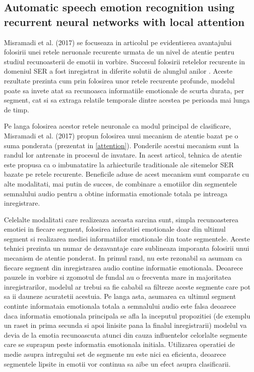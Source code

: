 \documentclass[a4paper,12pt]{book}
\begin{document}
					\subsection{Automatic speech emotion recognition using recurrent neural networks with local attention}
					 \label{prez_misramadi}
					 Misramadi et al. (2017) se focuseaza in articolul \cite{misramadi} pe evidentierea avantajului folosirii unei retele neruonale recurente urmata de un nivel de atentie pentru studiul recunoasterii de emotii in vorbire. Succesul folosirii retelelor recurente in domeniul SER a fost inregistrat in diferite solutii de alunglul anilor \cite{yuan,multi-domain,rnn1,rnn2}. Aceste rezultate prezinta cum prin folosirea unor retele recurente profunde, modelul poate sa invete atat sa recunoasca informatiile emotionale de scurta durata, per segment, cat si sa extraga relatile temporale dintre acestea pe perioada mai lunga de timp. \par
					 
					  \par 
					 Pe langa folosirea acestor retele neuronale ca modul principal de clasificare, Misramadi et al. (2017) propun folosirea unui mecanism de atentie bazat pe o suma ponderata (prezentat in \ref{attention}). Ponderile acestui mecanism sunt la randul lor antrenate in procesul de invatare. In acest articol, tehnica de atentie este propusa ca o imbunatatire la arhiecturile traditionale ale sitemelor SER bazate pe retele recurente. Beneficile aduse de acest mecanism sunt comparate cu alte modalitati, mai putin de succes, de combinare a emotiilor din segmentele semnalului audio pentru a obtine informatia emotionale totala pe intreaga inregistrare. \par
					 
					 Celelalte modalitati care realizeaza aceasta sarcina sunt, simpla recunoasterea emotiei in fiecare segment, folosirea inforatiei emotionale doar din ultimul segment si realizarea mediei informatiilor emotionale din toate segmentele. Aceste tehnici prezinta un numar de dezavantaje care sublineaza imporanta folosirii unui mecanism de atentie ponderat. In primul rand, nu este rezonabil sa asumam ca fiecare segment din inregistrarea audio contine informatie emotionala. Deoarece pauzele in vorbire si zgomotul de fundal au o frecventa mare in majoritatea inregistrarilor, modelul ar trebui sa fie cababil sa filtreze aceste segmente care pot sa ii dauneze acuratetii acestuia. Pe langa asta, asumarea ca ultimul segment continte informataia emotionala totala a semnalului audio este falsa deoarece daca informatia emotionala principala se afla la inceputul propozitiei (de exemplu un raset in prima secunda si apoi linisite pana la finalul inregistrarii) modelul va devia de la emotia recunoascuta atunci din cauza influentelor celorlalte segmente care se suprapun peste informatia emotionala initiala. Utilizarea operatiei de medie asupra intregului set de segmente nu este nici ea eficienta, deoarece segmentele lipsite in emotii vor continua sa aibe un efect asupra clasificarii. \par
					 
\end{document}
